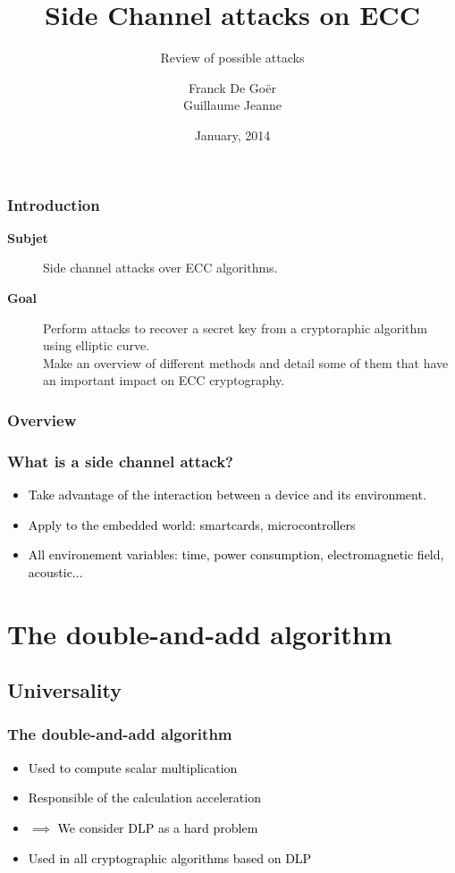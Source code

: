 \documentclass{beamer}
\title[ECC Side channel attacks]{Side Channel attacks on ECC}
\subtitle{Review of possible attacks}
\author{Franck De Goër\\Guillaume Jeanne}
\institute{SCCI - Ensimag}
\date{January, 2014}
\begin{document}
\begin{frame}
    \titlepage
\end{frame}

\begin{frame}[t]
    \frametitle{Introduction}
    \vspace{1cm}
    \begin{description}
        \item[{\bf Subjet}] Side channel attacks over ECC algorithms.
        \item[{\bf Goal}] Perform attacks to recover a secret key from a cryptoraphic algorithm using elliptic curve. \\
	Make an overview of different methods and detail some of them that have an important impact on ECC cryptography.
	
    \end{description}
\end{frame}

\begin{frame}
    \frametitle{Overview}
    \tableofcontents
\end{frame}

\begin{frame}
    \frametitle{What is a side channel attack?}
    \begin{itemize}
        \item \textcolor{black} {Take advantage of the interaction between a device and its environment.}
        \item \textcolor{black} {Apply to the embedded world: smartcards, microcontrollers}
	\item \textcolor{black} {All environement variables: time, power consumption, electromagnetic field, acoustic...}
    \end{itemize}

\end{frame}


\section{The double-and-add algorithm}
    \subsection{Universality}

\begin{frame}
    \frametitle{The double-and-add algorithm}
    \begin{itemize}
        \item \textcolor{black} {Used to compute scalar multiplication}
        \item \textcolor{black} {Responsible of the calculation acceleration}
	\item \textcolor{black} {$\implies$ We consider DLP as a hard problem}
	\item \textcolor{black} {Used in all cryptographic algorithms based on DLP}
    \end{itemize}

\end{frame}
\end{document}
